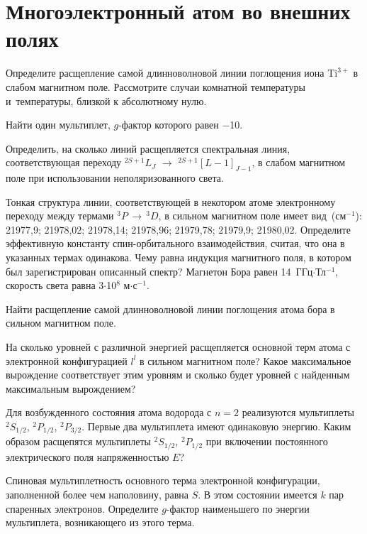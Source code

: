 \setmainfont{Noto Serif}
\setsansfont{Noto Sans}
\setmonofont{Noto Sans Mono}


\section{Многоэлектронный атом во внешних полях}

 Определите расщепление самой длинноволновой линии поглощения иона $\text{Ti}^{3+}$ в слабом магнитном поле. Рассмотрите случаи комнатной температуры и~температуры, близкой к абсолютному нулю.
\par
{} Найти один мультиплет, $g$-фактор которого равен $-$10.
\par
{} Определить, на сколько линий расщепляется спектральная линия, соответствующая переходу $^{2S+1}L_J$ $\rightarrow$ $^{2S+1}[L-1]_{J-1}$, в слабом магнитном поле при использовании неполяризованного света.
\par
{} Тонкая структура линии, соответствующей в некотором атоме электронному переходу между термами $^3P \,\rightarrow\,^3D$, в сильном магнитном поле имеет вид~(см$^{-1}$): 21977,9; 21978,02; 21978,14; 21978,96; 21979,78; 21979,9; 21980,02. Определите эффективную константу спин-орбитального взаимодействия, считая, что она в указанных термах одинакова. Чему равна индукция магнитного поля, в котором был зарегистрирован описанный спектр? Магнетон Бора равен 14~ГГц$\cdot$Тл$^{-1}$, скорость света равна 3$\cdot$10$^8$ м$\cdot$с$^{-1}$.
\par
{} Найти расщепление самой длинноволновой линии поглощения атома бора в сильном магнитном поле.
\par
{} На сколько уровней с различной энергией расщепляется основной терм атома с электронной конфигурацией $l^l$ в сильном магнитном поле? Какое максимальное вырождение соответствует этим уровням и сколько будет уровней с найденным максимальным вырождением?
\par
{} Для возбужденного состояния атома водорода с $n = 2$ реализуются мультиплеты $^2S_{1/2}$, $^2P_{1/2}$, $^2P_{3/2}$. Первые два мультиплета имеют одинаковую энергию. Каким образом расщепятся мультиплеты $^2S_{1/2}$, $^2P_{1/2}$ при включении постоянного электрического поля напряженностью $E$?
\par
{} Спиновая мультиплетность основного терма электронной конфигурации, заполненной более чем наполовину, равна $S$. В этом состоянии имеется $k$ пар спаренных электронов. Определите $g$-фактор наименьшего по энергии мультиплета, возникающего из этого терма.
